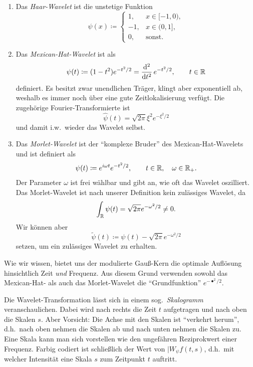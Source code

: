 \begin{example}[Wavelets]
\begin{enumerate}
\item Das \emph{Haar-Wavelet} ist die unstetige Funktion
  \[
    \psi(x) \coloneqq \begin{cases}
      1, & x \in [-1,0), \\
      -1, & x \in (0,1], \\
      0, & \text{sonst}.
    \end{cases}
  \]
\item Das \emph{Mexican-Hat-Wavelet} ist als
  \[
    \psi(t) \coloneqq (1 - t^{2}) e^{-t^{2} / 2} = \dod[2]{}{t} e^{-t^{2} / 2}, \qquad t \in \R
  \]
  definiert. Es besitzt zwar unendlichen Träger, klingt aber exponentiell ab, weshalb es immer noch
  über eine gute Zeitlokalisierung verfügt. Die zugehörige Fourier-Transformierte ist
  \[
    \widehat{\psi}(t) = \sqrt{2\pi} \xi^{2} e^{-\xi^{2} / 2}
  \]
  und damit i.w.\ wieder das Wavelet selbst.
\item Das \emph{Morlet-Wavelet} ist der \enquote{komplexe Bruder} des Mexican-Hat-Wavelets und ist
  definiert als
  \[
    \psi(t) \coloneqq e^{i \omega t} e^{-t^{2} / 2}, \qquad t \in \mathbb{R}, \quad \omega \in \mathbb{R}_{+}.
  \]
  Der Parameter $ \omega $ ist frei wählbar und gibt an, wie oft das Wavelet oszilliert.
  Das Morlet-Wavelet ist nach unserer Definition kein zulässiges Wavelet, da
  \[
    \int_{\mathbb{R}} \psi(t) = \sqrt{2\pi} e^{-\omega^{2} / 2} \neq 0.
  \]
  Wir können aber
  \[
    \widetilde{\psi}(t) \coloneqq \psi(t) - \sqrt{2\pi} e^{-\omega^{2} / 2}
  \]
  setzen, um ein zulässiges Wavelet zu erhalten.
\end{enumerate}
\end{example}

\begin{remark}
Wie wir wissen, bietet uns der modulierte Gauß-Kern die optimale Auflösung hinsichtlich Zeit
\emph{und} Frequenz. Aus diesem Grund verwenden sowohl das Mexican-Hat- als auch das Morlet-Wavelet
die \enquote{Grundfunktion} $ e^{-\bullet^{2} / 2} $.
\end{remark}

\begin{remark}[Skalogramm]
Die Wavelet-Transformation lässt sich in einem sog.\ \emph{Skalogramm} veranschaulichen. Dabei wird
nach rechts die Zeit $ t $ aufgetragen und nach oben die Skalen $ s $. Aber Vorsicht: Die Achse mit
den Skalen ist \enquote{verkehrt herum}, d.h.\ nach oben nehmen die Skalen ab und nach unten nehmen
die Skalen zu. Eine Skala kann man sich vorstellen wie den ungefähren Reziprokwert einer Frequenz.
Farbig codiert ist schließlich der Wert von $ |W_{\psi}f(t,s) $, d.h.\ mit welcher Intensität eine
Skala $ s $ zum Zeitpunkt $ t $ auftritt.
\end{remark}

